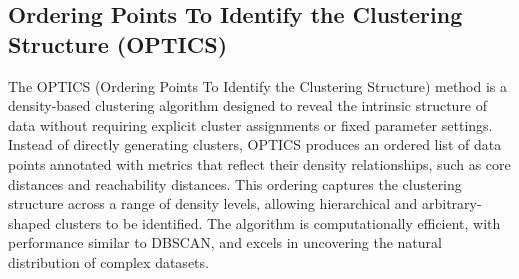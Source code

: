 \subsection{Ordering Points To Identify the Clustering Structure (OPTICS)}

The OPTICS (Ordering Points To Identify the Clustering Structure) method is a density-based clustering algorithm designed to reveal
 the intrinsic structure of data without requiring explicit cluster assignments or fixed parameter settings. Instead of directly
  generating clusters, OPTICS produces an ordered list of data points annotated with metrics that reflect their density relationships, 
  such as core distances and reachability distances. This ordering captures the clustering structure across a range of density levels,
   allowing hierarchical and arbitrary-shaped clusters to be identified. 
The algorithm is computationally efficient, with performance similar to DBSCAN, and excels in uncovering the natural distribution of 
complex datasets.